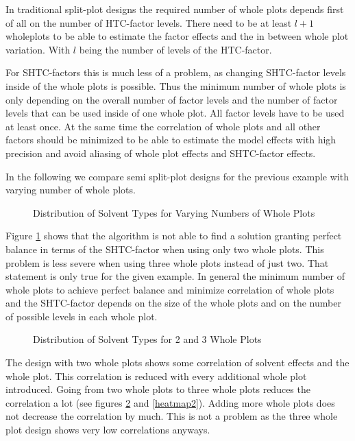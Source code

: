 In traditional split-plot designs the required number of whole plots depends first of all on the number of HTC-factor levels. There need to be at least $l + 1$ wholeplots to be able to estimate the factor effects and the in between whole plot variation. With $l$ being the number of levels of the HTC-factor.

For SHTC-factors this is much less of a problem, as changing SHTC-factor levels inside of the whole plots is possible. Thus the minimum number of whole plots is only depending on the overall number of factor levels and the number of factor levels that can be used inside of one whole plot. All factor levels have to be used at least once. At the same time the correlation of whole plots and all other factors should be minimized to be able to estimate the model effects with high precision and avoid aliasing of whole plot effects and SHTC-factor effects.

In the following we compare semi split-plot designs for the previous example with varying number of whole plots.

\begin{figure}[!h]
	\caption{Distribution of Solvent Types for Varying Numbers of Whole Plots}
	\label{barchart2} \label{balance2}
\end{figure}


Figure \ref{balance2} shows that the algorithm is not able to find a solution granting perfect balance in terms of the SHTC-factor when using only two whole plots. This problem is less severe when using three whole plots instead of just two. That statement is only true for the given example. In general the minimum number of whole plots to achieve perfect balance and minimize correlation of whole plots and the SHTC-factor depends on the size of the whole plots and on the number of possible levels in each whole plot. 

\begin{figure}[!h]
	\caption{Distribution of Solvent Types for 2 and 3 Whole Plots}
	\label{barchart2}
\end{figure}

The design with two whole plots shows some correlation of solvent effects and the whole plot. This correlation is reduced with every additional whole plot introduced. Going from two whole plots to three whole plots reduces the correlation a lot (see figures \ref{barchart2} and \ref{heatmap2}). Adding more whole plots does not decrease  the correlation by much. This is not a problem as the three whole plot design shows very low correlations anyways.

\begin{figure*}[!h]
	\caption{Degree of Aliasing for Different Numbers of Whole Plots}
	\label{heatmap2}
\end{figure*}